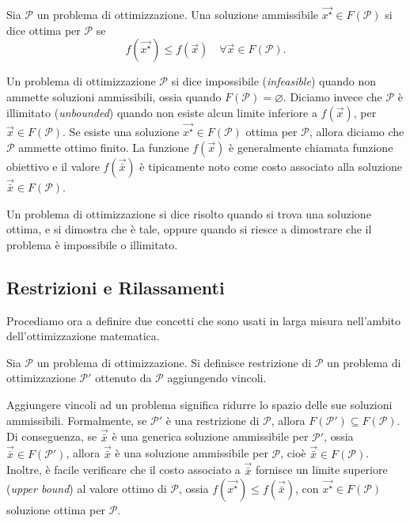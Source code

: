 \begin{definition}
Sia $\mathcal{P}$ un problema di ottimizzazione. Una soluzione ammissibile
$\vec{x^{\star}} \in F(\mathcal{P})$ si dice ottima per $\mathcal{P}$ se
\[
    f(\vec{x^{\star}}) \le f(\vec{x}) \quad \forall \vec{x} \in
    F(\mathcal{P}).
\]
\end{definition}
Un problema di ottimizzazione $\mathcal{P}$ si dice impossibile
(\textit{infeasible}) quando non ammette soluzioni ammissibili, ossia
quando $F(\mathcal{P}) = \varnothing$. Diciamo invece che $\mathcal{P}$ è
illimitato (\textit{unbounded}) quando non esiste alcun limite inferiore a
$f(\vec{x})$, per $\vec{x} \in F(\mathcal{P})$. Se esiste una soluzione
$\vec{x^{\star}} \in F(\mathcal{P})$ ottima per $\mathcal{P}$, allora diciamo
che $\mathcal{P}$ ammette ottimo finito. La funzione $f(\vec{x})$ è
generalmente chiamata funzione obiettivo e il valore $f(\vec{\bar{x}})$ è
tipicamente noto come costo associato alla soluzione $\vec{\bar{x}} \in
F(\mathcal{P})$.

Un problema di ottimizzazione si dice risolto quando si trova una soluzione
ottima, e si dimostra che è tale, oppure quando si riesce a dimostrare che
il problema è impossibile o illimitato.

\subsection{Restrizioni e Rilassamenti}

Procediamo ora a definire due concetti che sono usati in larga misura
nell'ambito dell'ottimizzazione matematica.

\begin{definition}[Restrizione]
    Sia $\mathcal{P}$ un problema di ottimizzazione. Si definisce
    restrizione di $\mathcal{P}$ un problema di ottimizzazione
    $\mathcal{P}'$ ottenuto da $\mathcal{P}$ aggiungendo vincoli.
\end{definition}
Aggiungere vincoli ad un problema significa ridurre lo spazio delle sue
soluzioni ammissibili. Formalmente, se $\mathcal{P}'$ è una restrizione di
$\mathcal{P}$, allora $F(\mathcal{P}') \subseteq F(\mathcal{P})$. Di
conseguenza, se $\vec{\bar{x}}$ è una generica soluzione ammissibile per
$\mathcal{P}'$, ossia $\vec{\bar{x}} \in F(\mathcal{P}')$, allora
$\vec{\bar{x}}$ è una soluzione ammissibile per $\mathcal{P}$, cioè
$\vec{\bar{x}} \in F(\mathcal{P})$. Inoltre, è facile verificare che il
costo associato a $\vec{\bar{x}}$ fornisce un limite superiore
(\textit{upper bound}) al valore ottimo di $\mathcal{P}$, ossia
$f(\vec{x^{\star}}) \le f(\vec{\bar{x}})$, con $\vec{x^{\star}} \in
F(\mathcal{P})$ soluzione ottima per $\mathcal{P}$.

